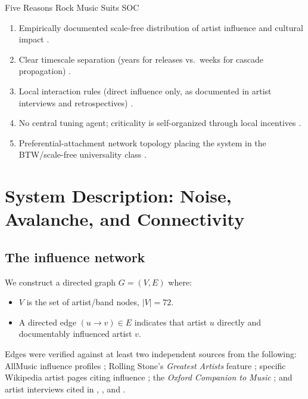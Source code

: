 \documentclass[12pt, a4paper]{article}
\begin{document}
\begin{definitionbox}{Five Reasons Rock Music Suits SOC}
\begin{enumerate}[noitemsep, leftmargin=*]
  \item Empirically documented scale-free distribution of
        artist influence and cultural impact \citep{mauch2015,
        allmusic2024}.
  \item Clear timescale separation (years for releases vs.\
        weeks for cascade propagation)
        \citep{discogsbeatles, billboardarchive}.
  \item Local interaction rules (direct influence only, as
        documented in artist interviews and retrospectives)
        \citep{cross2001, azerrad1994}.
  \item No central tuning agent; criticality is self-organized
        through local incentives \citep{bak1996}.
  \item Preferential-attachment network topology placing the
        system in the BTW/scale-free universality class
        \citep{barabasi1999, goh2003}.
\end{enumerate}
\end{definitionbox}


\section{System Description: Noise, Avalanche, and Connectivity}
\label{sec:description}

\subsection{The influence network}

We construct a directed graph $G=(V,E)$ where:
\begin{itemize}
  \item $V$ is the set of artist/band nodes, $|V|=72$.
  \item A directed edge $(u\!\to\!v)\in E$ indicates that artist
    $u$ directly and documentably influenced artist $v$.
\end{itemize}

Edges were verified against at least two independent sources from
the following:
AllMusic influence profiles \citep{allmusic2024};
Rolling Stone's \textit{Greatest Artists} feature
\citep{rollingstoneartists};
specific Wikipedia artist pages citing influence
\citep{wikifluence2024};
the \textit{Oxford Companion to Music} \citep{latham2011};
and artist interviews cited in
\citet{shadwick2003}, \citet{azerrad1994}, and
\citet{cross2001}.
\end{document}
